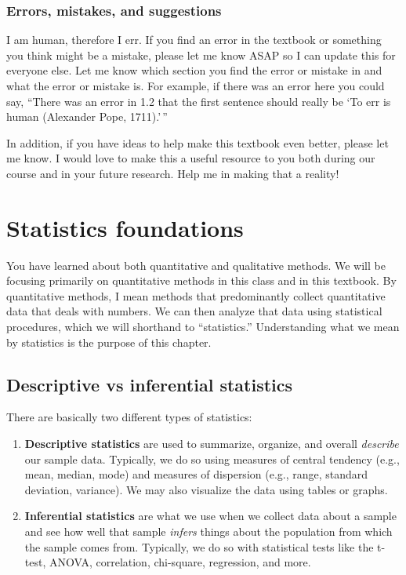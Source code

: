 \documentclass[
]{book}
\begin{document}
\hypertarget{errors-mistakes-and-suggestions}{%
\subsection{Errors, mistakes, and suggestions}\label{errors-mistakes-and-suggestions}}

I am human, therefore I err. If you find an error in the textbook or something you think might be a mistake, please let me know ASAP so I can update this for everyone else. Let me know which section you find the error or mistake in and what the error or mistake is. For example, if there was an error here you could say, ``There was an error in 1.2 that the first sentence should really be `To err is human (Alexander Pope, 1711).'\,''

In addition, if you have ideas to help make this textbook even better, please let me know. I would love to make this a useful resource to you both during our course and in your future research. Help me in making that a reality!

\hypertarget{statistics-foundations}{%
\chapter{Statistics foundations}\label{statistics-foundations}}

You have learned about both quantitative and qualitative methods. We will be focusing primarily on quantitative methods in this class and in this textbook. By quantitative methods, I mean methods that predominantly collect quantitative data that deals with numbers. We can then analyze that data using statistical procedures, which we will shorthand to ``statistics.'' Understanding what we mean by statistics is the purpose of this chapter.

\hypertarget{descriptive-vs-inferential-statistics}{%
\section{Descriptive vs inferential statistics}\label{descriptive-vs-inferential-statistics}}

There are basically two different types of statistics:

\begin{enumerate}
\def\labelenumi{\arabic{enumi}.}
\item
  \textbf{Descriptive statistics} are used to summarize, organize, and overall \emph{describe} our sample data. Typically, we do so using measures of central tendency (e.g., mean, median, mode) and measures of dispersion (e.g., range, standard deviation, variance). We may also visualize the data using tables or graphs.
\item
  \textbf{Inferential statistics} are what we use when we collect data about a sample and see how well that sample \emph{infers} things about the population from which the sample comes from. Typically, we do so with statistical tests like the t-test, ANOVA, correlation, chi-square, regression, and more.
\end{enumerate}
\end{document}
